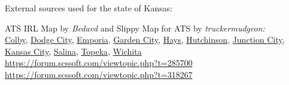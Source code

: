
















\vspace{2em}\footnoterule
{\footnotesize \noindent External sources used for the state of Kansas:
\begin{description}[
style=nextline,
leftmargin=1.1em,
labelsep=0pt,
parsep=0pt,
font=\normalfont,
]

\item[$\ast$]
ATS IRL Map by \textit{Bedavd} and Slippy Map for ATS by \textit{truckermudgeon:}\\
\hyperref[city:Colby]{Colby},
\hyperref[city:Dodge City]{Dodge City},
\hyperref[city:Emporia]{Emporia},
\hyperref[city:Garden City]{Garden City},
\hyperref[city:Hays]{Hays},
\hyperref[city:Hutchinson]{Hutchinson},
\hyperref[city:Junction City]{Junction City},
\hyperref[city:kansas_ci_ks]{Kansas City},
\hyperref[city:salina_ks]{Salina},
\hyperref[city:Topeka]{Topeka},
\hyperref[city:Wichita]{Wichita}
\\ \url{https://forum.scssoft.com/viewtopic.php?t=285700}
\\ \url{https://forum.scssoft.com/viewtopic.php?t=318267}

\end{description}
}

